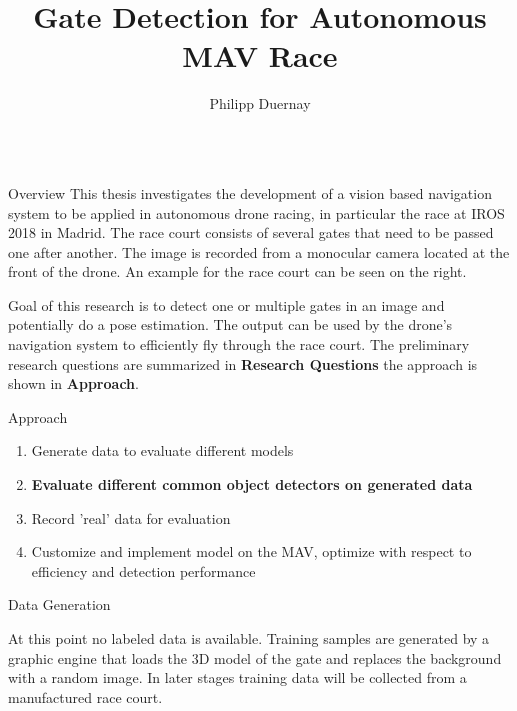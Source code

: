 \documentclass{beamer}
\author[p.duernay@protonmail.com]{Philipp Duernay}
\title{Gate Detection for Autonomous MAV Race}
\institute{TU Delft}
\begin{document}
\begin{frame}[fragile]
\begin{columns}[T]

\begin{column}{.25\textwidth}

	
\begin{block}{Overview}
This thesis investigates the development of a vision based navigation system to be applied in autonomous drone racing, in particular the race at IROS 2018 in Madrid. The race court consists of several gates that need to be passed one after another. The image is recorded from a monocular camera located at the front of the drone. An example for the race court can be seen on the right. 

Goal of this research is to detect one or multiple gates in an image and potentially do a pose estimation. The output can be used by the drone's navigation system to efficiently fly through the race court. The preliminary research questions are summarized in \textbf{Research Questions} the approach is shown in \textbf{Approach}.

\end{block}

\begin{block}{Approach}
	\label{box::approach}
	\begin{enumerate}
		\item Generate data to evaluate different models
		\item \textbf{Evaluate different common object detectors on generated data}
		\item Record 'real' data for evaluation
		\item Customize and implement model on the MAV, optimize with respect to efficiency and detection performance
	\end{enumerate}
	
\end{block}



	\begin{block}{Data Generation}
		
		At this point no labeled data is available. Training samples are generated by a graphic engine that loads the 3D model of the gate and replaces the background with a random image. In later stages training data will be collected from a manufactured race court.
		

\end{block}
\end{column}
\end{columns}
\end{frame}
\end{document}
